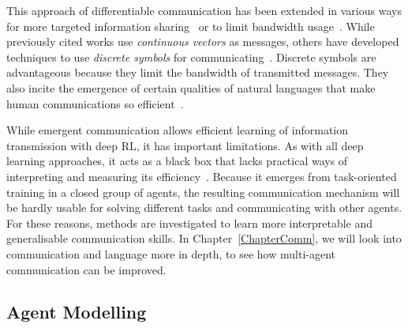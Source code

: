 This approach of differentiable communication has been extended in various ways for more targeted information sharing~\citep{Hoshen2017_VAIN, Jiang2018_ATOC, Das2019_TarMAC} or to limit bandwidth usage~\citep{Singh2019_IC3Net, Zhang2019_VBC, Wang2020_IMAC, Han2023_MBC}. While previously cited works use \textit{continuous vectors} as messages, others have developed techniques to use \textit{discrete symbols} for communicating~\citep{Cao2018_Negotiation, Lazaridou2018_Emergence, Jaques2019_SocialInfluence, Kim2018_SchedNet, Rita2022_GenOverf}. Discrete symbols are advantageous because they limit the bandwidth of transmitted messages. They also incite the emergence of certain qualities of natural languages that make human communications so efficient~\citep{Mordatch2018_GroundedCompo, Chaabouni2019_AntiEfficient}. 

While emergent communication allows efficient learning of information transmission with deep RL, it has important limitations. As with all deep learning approaches, it acts as a black box that lacks practical ways of interpreting and measuring its efficiency~\citep{Lowe2019_Pitfalls, Lazaridou2020_DeepEmergentComm}. Because it emerges from task-oriented training in a closed group of agents, the resulting communication mechanism will be hardly usable for solving different tasks and communicating with other agents. For these reasons, methods are investigated to learn more interpretable and generalisable communication skills. In Chapter~\ref{ChapterComm}, we will look into communication and language more in depth, to see how multi-agent communication can be improved. 





\subsection{Agent Modelling}\label{sec:MADRL:AgentModelling}


